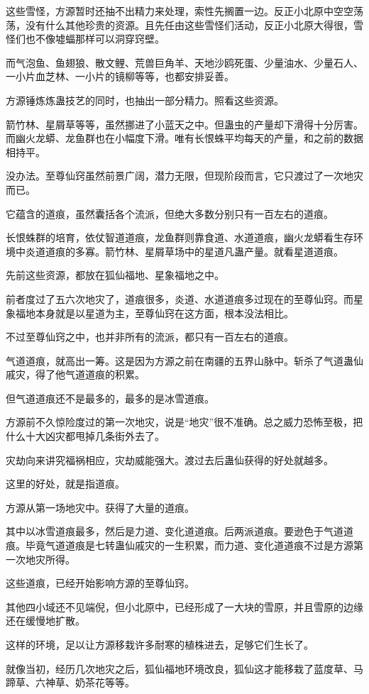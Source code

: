 \begin{this_body}
这些雪怪，方源暂时还抽不出精力来处理，索性先搁置一边。反正小北原中空空荡荡，没有什么其他珍贵的资源。且先任由这些雪怪们活动，反正小北原大得很，雪怪们也不像墟蝠那样可以洞穿窍壁。

而气泡鱼、鱼翅狼、散文鲤、荒兽巨角羊、天地沙鸥死蛋、少量油水、少量石人、一小片血芝林、一小片的镜柳等等，也都安排妥善。

方源锤炼炼蛊技艺的同时，也抽出一部分精力。照看这些资源。

箭竹林、星屑草等等，虽然挪进了小蓝天之中。但蛊虫的产量却下滑得十分厉害。而幽火龙蟒、龙鱼群也在小幅度下滑。唯有长恨蛛平均每天的产量，和之前的数据相持平。

没办法。至尊仙窍虽然前景广阔，潜力无限，但现阶段而言，它只渡过了一次地灾而已。

它蕴含的道痕，虽然囊括各个流派，但绝大多数分别只有一百左右的道痕。

长恨蛛群的培育，依仗智道道痕，龙鱼群则靠食道、水道道痕，幽火龙蟒看生存环境中炎道道痕的多寡。箭竹林、星屑草场中的星道凡蛊产量。就看星道道痕。

先前这些资源，都放在狐仙福地、星象福地之中。

前者度过了五六次地灾了，道痕很多，炎道、水道道痕多过现在的至尊仙窍。而星象福地本身就是以星道为主，至尊仙窍在这方面，根本没法相比。

不过至尊仙窍之中，也并非所有的流派，都只有一百左右的道痕。

气道道痕，就高出一筹。这是因为方源之前在南疆的五界山脉中。斩杀了气道蛊仙戚灾，得了他气道道痕的积累。

但气道道痕还不是最多的，最多的是冰雪道痕。

方源前不久惊险度过的第一次地灾，说是“地灾”很不准确。总之威力恐怖至极，把什么十大凶灾都甩掉几条街外去了。

灾劫向来讲究福祸相应，灾劫威能强大。渡过去后蛊仙获得的好处就越多。

这里的好处，就是指道痕。

方源从第一场地灾中。获得了大量的道痕。

其中以冰雪道痕最多，然后是力道、变化道道痕。后两派道痕。要逊色于气道道痕。毕竟气道道痕是七转蛊仙戚灾的一生积累，而力道、变化道道痕不过是方源第一次地灾所得。

这些道痕，已经开始影响方源的至尊仙窍。

其他四小域还不见端倪，但小北原中，已经形成了一大块的雪原，并且雪原的边缘还在缓慢地扩散。

这样的环境，足以让方源移栽许多耐寒的植株进去，足够它们生长了。

就像当初，经历几次地灾之后，狐仙福地环境改良，狐仙这才能移栽了蓝度草、马蹄草、六神草、奶茶花等等。


\end{this_body}
